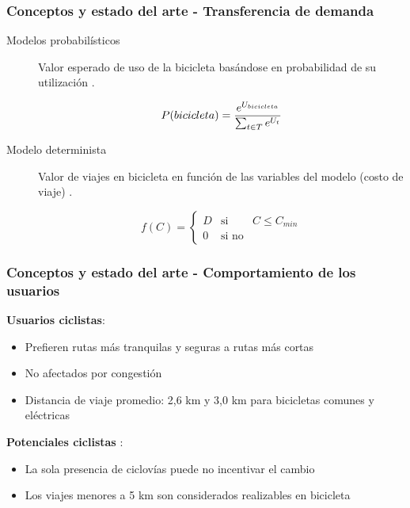 \documentclass[aspectratio=43, 10pt]{beamer}
\begin{document}
\begin{frame}
    \frametitle{Conceptos y estado del arte - Transferencia de demanda}


    \begin{description}
        \item[Modelos probabilísticos] {
            Valor esperado de uso de la bicicleta basándose en probabilidad de su utilización
            \parencite{ortuz2011, Liu2019, Pacheco2021}.

            \begin{equation*}
                P(bicicleta) = {e^{U_{bicicleta}} \over \sum_{t \in T} e^{U_t}}
            \end{equation*}
        }
        \item[Modelo determinista] {
            Valor de viajes en bicicleta en función de las variables del modelo (costo de viaje)
            \parencite{marin2007, laporte2007}.

            \begin{equation*}
                f(C) = \left\{ \begin{array}{lcr}
                D & \text{si}   & C \leq C_{min} \\
                  0 & \text{si no} &
            \end{array}
            \right.
            \end{equation*}
        }
    \end{description}
\end{frame}


\begin{frame}
    \frametitle{Conceptos y estado del arte - Comportamiento de los usuarios}

    \textbf{Usuarios ciclistas}:

    \begin{itemize}
        \item{Prefieren rutas más tranquilas y seguras a rutas más cortas \parencite{winters2010}}
        \item{No afectados por congestión \parencite{Lin2013, Duthie2014}}
        \item{Distancia de viaje promedio: 2,6 km y 3,0 km para bicicletas comunes y eléctricas \parencite{anette2018}}
    \end{itemize}

    \textbf{Potenciales ciclistas} \parencite{shwe2014}:

    \begin{itemize}
        \item{La sola presencia de ciclovías puede no incentivar el cambio}
        \item{Los viajes menores a 5 km son considerados realizables en bicicleta}
    \end{itemize}
\end{frame}
\end{document}
